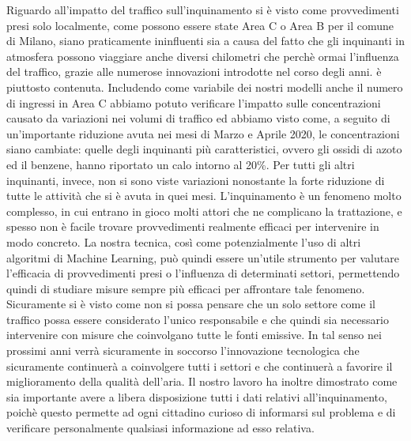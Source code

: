 \documentclass[a4paper]{report}
\begin{document}
Riguardo all'impatto del traffico sull'inquinamento si è visto come provvedimenti presi solo localmente, come possono essere state Area C o Area B per il comune di Milano, siano praticamente ininfluenti sia a causa del fatto che gli inquinanti in atmosfera possono viaggiare anche diversi chilometri che perchè ormai l'influenza del traffico, grazie alle numerose innovazioni introdotte nel corso degli anni. è piuttosto contenuta. Includendo come variabile dei nostri modelli anche il numero di ingressi in Area C abbiamo potuto verificare l'impatto sulle concentrazioni causato da variazioni nei volumi di traffico ed abbiamo visto come, a seguito di un'importante riduzione avuta nei mesi di Marzo e Aprile 2020, le concentrazioni siano cambiate: quelle degli inquinanti più caratteristici, ovvero gli ossidi di azoto ed il benzene, hanno riportato un calo intorno al 20\%. Per tutti gli altri inquinanti, invece, non si sono viste variazioni nonostante la forte riduzione di tutte le attività che si è avuta in quei mesi.
L'inquinamento è un fenomeno molto complesso, in cui entrano in gioco molti attori che ne complicano la trattazione, e spesso non è facile trovare provvedimenti realmente efficaci per intervenire in modo concreto. La nostra tecnica, così come potenzialmente l'uso di altri algoritmi di Machine Learning, può quindi essere un'utile strumento per valutare l'efficacia di provvedimenti presi o l'influenza di determinati settori, permettendo quindi di studiare misure sempre più efficaci per affrontare tale fenomeno. Sicuramente si è visto come non si possa pensare che un solo settore come il traffico possa essere considerato l'unico responsabile e che quindi sia necessario intervenire con misure che coinvolgano tutte le fonti emissive. In tal senso nei prossimi anni verrà sicuramente in soccorso l'innovazione tecnologica che sicuramente continuerà a coinvolgere tutti i settori e che continuerà a favorire il miglioramento della qualità dell'aria.  
Il nostro lavoro ha inoltre dimostrato come sia importante avere a libera disposizione tutti i dati relativi all'inquinamento, poichè questo permette ad ogni cittadino curioso di informarsi sul problema e di verificare personalmente qualsiasi informazione ad esso relativa.






{}
\end{document}
